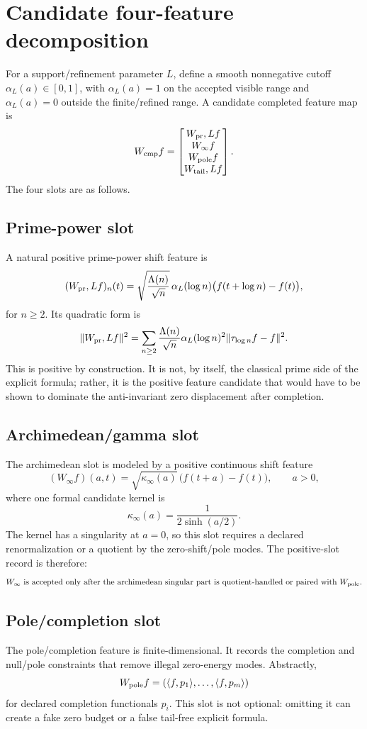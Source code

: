 \documentclass[11pt]{article}
\newcommand{\Wcmp}{W_{\rm cmp}}
\newcommand{\Wpr}{W_{\rm pr}}
\newcommand{\Winf}{W_{\infty}}
\newcommand{\Wpole}{W_{\rm pole}}
\newcommand{\Wtail}{W_{\rm tail}}
\begin{document}
\section{Candidate four-feature decomposition}
For a support/refinement parameter \(L\), define a smooth nonnegative cutoff
\(\alpha_L(a)\in[0,1]\), with \(\alpha_L(a)=1\) on the accepted visible range
and \(\alpha_L(a)=0\) outside the finite/refined range.  A candidate completed
feature map is
\[
  \Wcmp f
  =
  \begin{bmatrix}
    \Wpr,L f\\
    \Winf f\\
    \Wpole f\\
    \Wtail,L f
  \end{bmatrix}.
\]
The four slots are as follows.

\subsection{Prime-power slot}
A natural positive prime-power shift feature is
\[
  (\Wpr,L f)_{n}(t)
  =
  \sqrt{\frac{\Lambda(n)}{\sqrt n}}\,\alpha_L(\log n)
  \bigl(f(t+\log n)-f(t)\bigr),
\]
for \(n\ge2\).  Its quadratic form is
\[
  \|\Wpr,L f\|^2
  =
  \sum_{n\ge2}\frac{\Lambda(n)}{\sqrt n}\alpha_L(\log n)^2
  \|\tau_{\log n}f-f\|^2.
\]
This is positive by construction.  It is not, by itself, the classical prime
side of the explicit formula; rather, it is the positive feature candidate that
would have to be shown to dominate the anti-invariant zero displacement after
completion.

\subsection{Archimedean/gamma slot}
The archimedean slot is modeled by a positive continuous shift feature
\[
  (\Winf f)(a,t)
  =\sqrt{\kappa_\infty(a)}\,\bigl(f(t+a)-f(t)\bigr),
  \qquad a>0,
\]
where one formal candidate kernel is
\[
  \kappa_\infty(a)=\frac{1}{2\sinh(a/2)}.
\]
The kernel has a singularity at \(a=0\), so this slot requires a declared
renormalization or a quotient by the zero-shift/pole modes.  The positive-slot
record is therefore:
\[
  \Winf \text{ is accepted only after the archimedean singular part is
  quotient-handled or paired with }\Wpole.
\]

\subsection{Pole/completion slot}
The pole/completion feature is finite-dimensional.  It records the completion
and null/pole constraints that remove illegal zero-energy modes.  Abstractly,
\[
  \Wpole f=(\langle f,p_1\rangle,\ldots,\langle f,p_m\rangle)
\]
for declared completion functionals \(p_i\).  This slot is not optional: omitting
it can create a fake zero budget or a false tail-free explicit formula.
\end{document}
